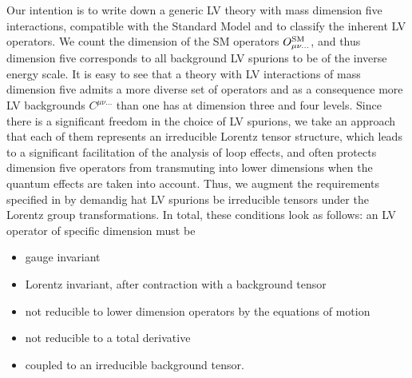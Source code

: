 \documentclass[12pt,preprintnumbers,nofootinbib]{revtex4}
\begin{document}
Our intention is to write down a generic LV theory with mass dimension
	five interactions, compatible with the Standard Model and to classify
	the inherent LV operators. We count the dimension of the SM operators
	$O^{\rm SM}_{\mu\nu...}$, and thus dimension five corresponds to all 
	background LV spurions to be of the inverse energy scale. 
%
	It is easy to see that a theory with LV interactions of mass
	dimension five admits a more diverse set of operators and as a consequence 
    more LV backgrounds $C^{\mu\nu...}$
than one has at dimension three and four levels. Since there is a significant 
freedom in the choice of LV spurions, we take an approach that each of them represents 
an  irreducible Lorentz tensor structure, which leads to a significant facilitation of the 
analysis of loop effects, and often protects dimension five operators from transmuting into 
lower dimensions when the quantum effects are taken into account. 
	Thus, we augment the requirements specified in 
\cite{MP:} by demandig hat LV spurions be irreducible tensors under the Lorentz group transformations.
	In total, these  conditions look as follows: 
	an LV operator of specific dimension must be
\begin{itemize}
	\item gauge invariant
	\item Lorentz invariant, after contraction with a background tensor
	\item not reducible to lower dimension operators by the equations
		of motion
	\item not reducible to a total derivative
	\item coupled to an irreducible background tensor.
\end{itemize}
\end{document}
